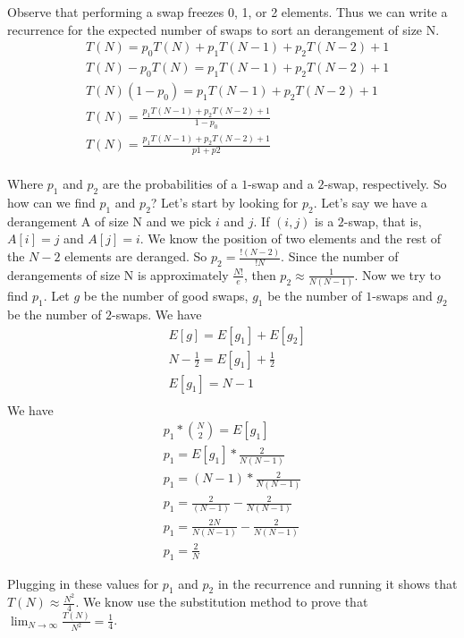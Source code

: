 \documentclass{article}
\begin{document}
Observe that performing a swap freezes 0, 1, or 2 elements. Thus we can write a recurrence
for the expected number of swaps to sort an derangement of size N.
\begin{align}
    & T(N) = p_0T(N) + p_1T(N - 1) + p_2T(N - 2) + 1 \\\nonumber
    & T(N) - p_0T(N) = p_1T(N - 1) + p_2T(N - 2) + 1 \\\nonumber
    & T(N)(1 - p_0) = p_1T(N - 1) + p_2T(N - 2) + 1 \\\nonumber
    & T(N) = \frac{p_1T(N - 1) + p_2T(N - 2) + 1}{1 - p_0} \\\nonumber
    & T(N) = \frac{p_1T(N - 1) + p_2T(N - 2) + 1}{p1 + p2} \\\nonumber
\end{align}

Where $p_1$ and $p_2$ are the probabilities of a $1$-swap and a $2$-swap, respectively.
So how can we find $p_1$ and $p_2$?
Let's start by looking for $p_2$. Let's say we have
a derangement A of size N and we pick $i$ and $j$. If $(i ,j)$ is a $2$-swap, that is,
$A[i] = j$ and $A[j] = i$. We know the position of two elements and the rest of the $N - 2$ elements
are deranged. So $p_2 = \frac{!(N - 2)}{!N}$. Since the number of derangements of size N is approximately
$\frac{N!}{e}$, then $p_2 \approx \frac{1}{N(N - 1)}$.
Now we try to find $p_1$. Let $g$ be the number of good swaps, $g_1$ be the number of $1$-swaps
and $g_2$ be the number of $2$-swaps. We have
\begin{align}
    & E[g] = E[g_1] + E[g_2] \\\nonumber
    & N - \frac{1}{2} = E[g_1] + \frac{1}{2} \\\nonumber
    & E[g_1] = N - 1  \\\nonumber
\end{align}
We have
\begin{align}
    p_1 * {N \choose 2} = E[g_1] \\\nonumber
    p_1 = E[g_1] * \frac{2}{N(N - 1)} \\\nonumber
    p_1 = (N - 1) * \frac{2}{N(N - 1)} \\\nonumber
    p_1 = \frac{2}{(N - 1)} - \frac{2}{N(N - 1)} \\\nonumber
    p_1 = \frac{2N}{N(N - 1)} - \frac{2}{N(N - 1)} \\\nonumber
    p_1 = \frac{2}{N}
\end{align}

Plugging in these values for $p_1$ and $p_2$ in the recurrence and running it shows
that $T(N) \approx \frac{N^2}{4}$. We know use the substitution method to prove that
$\lim_{N \to \infty} \frac{T(N)}{N^2} = \frac{1}{4}$.
\end{document}
